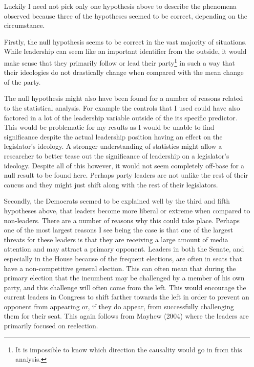 \documentclass[12pt,twoside]{reedthesis}
\begin{document}
  Luckily I need not pick only one hypothesis above to describe the
  phenomena observed because three of the hypotheses seemed to be correct,
  depending on the circumstance.
  
  Firstly, the null hypothesis seems to be correct in the vast majority of
  situations. While leadership can seem like an important identifier from
  the outside, it would make sense that they primarily follow or lead
  their
  party\footnote{It is impossible to know which direction the causality would go in from this analysis.}
  in such a way that their ideologies do not drastically change when
  compared with the mean change of the party.
  
  The null hypothesis might also have been found for a number of reasons
  related to the statistical analysis. For example the controls that I
  used could have also factored in a lot of the leadership variable
  outside of the its specific predictor. This would be problematic for my
  results as I would be unable to find significance despite the actual
  leadership position having an effect on the legislator's ideology. A
  stronger understanding of statistics might allow a researcher to better
  tease out the significance of leadership on a legislator's ideology.
  Despite all of this however, it would not seem completely off-base for a
  null result to be found here. Perhaps party leaders are not unlike the
  rest of their caucus and they might just shift along with the rest of
  their legislators.
  
  Secondly, the Democrats seemed to be explained well by the third and
  fifth hypotheses above, that leaders become more liberal or extreme when
  compared to non-leaders. There are a number of reasons why this could
  take place. Perhaps one of the most largest reasons I see being the case
  is that one of the largest threats for these leaders is that they are
  receiving a large amount of media attention and may attract a primary
  opponent. Leaders in both the Senate, and especially in the House
  because of the frequent elections, are often in seats that have a
  non-competitive general election. This can often mean that during the
  primary election that the incumbent may be challenged by a member of his
  own party, and this challenge will often come from the left. This would
  encourage the current leaders in Congress to shift farther towards the
  left in order to prevent an opponent from appearing or, if they do
  appear, from successfully challenging them for their seat. This again
  follows from Mayhew (2004) where the leaders are primarily focused on
  reelection.
  
\end{document}

